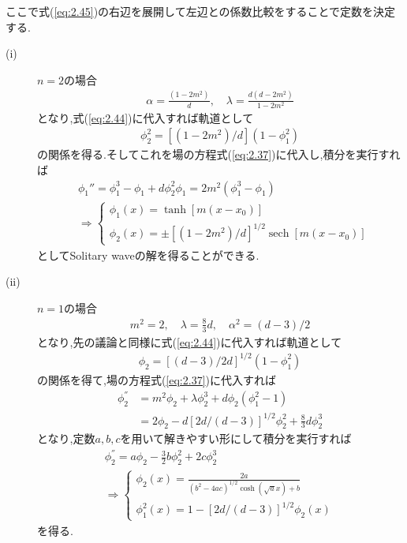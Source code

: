 \documentclass[dvipdfmx,11pt,a4paper]{jsbook}
\begin{document}
ここで式(\ref{eq:2.45})の右辺を展開して左辺との係数比較をすることで定数を決定する.
\begin{description}
    \item[(i)] $n=2$の場合\\
          \begin{align}
              \alpha=\frac{\left(1-2 m^{2}\right)}{d}, \quad \lambda=\frac{d\left(d-2 m^{2}\right)}{1-2 m^{2}}
          \end{align}
          となり,式(\ref{eq:2.44})に代入すれば軌道として
          \begin{align*}
              \phi_2^2=\left[(1-2m^2)/d\right](1-\phi_1^2)
          \end{align*}
          の関係を得る.そしてこれを場の方程式(\ref{eq:2.37})に代入し,積分を実行すれば
          \begin{align}
               & \phi_1''=\phi_1^3-\phi_1+d\phi_2^2\phi_1=2m^2(\phi_1^3-\phi_1) \\
               & \Rightarrow
              \begin{cases}
                  \phi_{1}(x)=\tanh \left[m\left(x-x_{0}\right)\right] \\
                  \phi_{2}(x)=\pm\left[\left(1-2 m^{2}\right) / d\right]^{1 / 2} \operatorname{sech}\left[m\left(x-x_{0}\right)\right]
              \end{cases}\label{eq:2.48}
          \end{align}
          としてSolitary waveの解を得ることができる.
    \item[(ii)] $n=1$の場合\\
          \begin{align}
              m^{2}=2, \quad \lambda=\frac{8}{3} d, \quad \alpha^{2}=(d-3)/2
          \end{align}
          となり,先の議論と同様に式(\ref{eq:2.44})に代入すれば軌道として
          \begin{align*}
              \phi_{2}=[(d-3) / 2 d]^{1 / 2}\left(1-\phi_{1}^{2}\right)
          \end{align*}
          の関係を得て,場の方程式(\ref{eq:2.37})に代入すれば
          \begin{align}
              \phi_{2}^{''} & =m^{2} \phi_{2}+\lambda \phi_{2}^{3}+d \phi_{2}\left(\phi_{1}^{2}-1\right)\nonumber \\
                            & =2 \phi_{2}-d[2 d /(d-3)]^{1 / 2} \phi_{2}^{2}+\frac{8}{3} d \phi_{2}^{3}
          \end{align}
          となり,定数$a,b,c$を用いて解きやすい形にして積分を実行すれば
          \begin{align}
              \phi_{2}^{''}=a \phi_{2}-\frac{3}{2} b \phi_{2}^{2}+2 c \phi_{2}^{3} \\
              \Rightarrow
              \begin{cases}
                  \phi_{2}(x)=\frac{2 a}{\left(b^{2}-4 a c\right)^{1 / 2} \cosh (\sqrt{a} x)+b} \\
                  \phi_{1}^{2}(x)=1-[2 d /(d-3)]^{1 / 2} \phi_{2}(x)
              \end{cases}\label{eq:2.52}
          \end{align}
          を得る.
\end{description}
\end{document}
